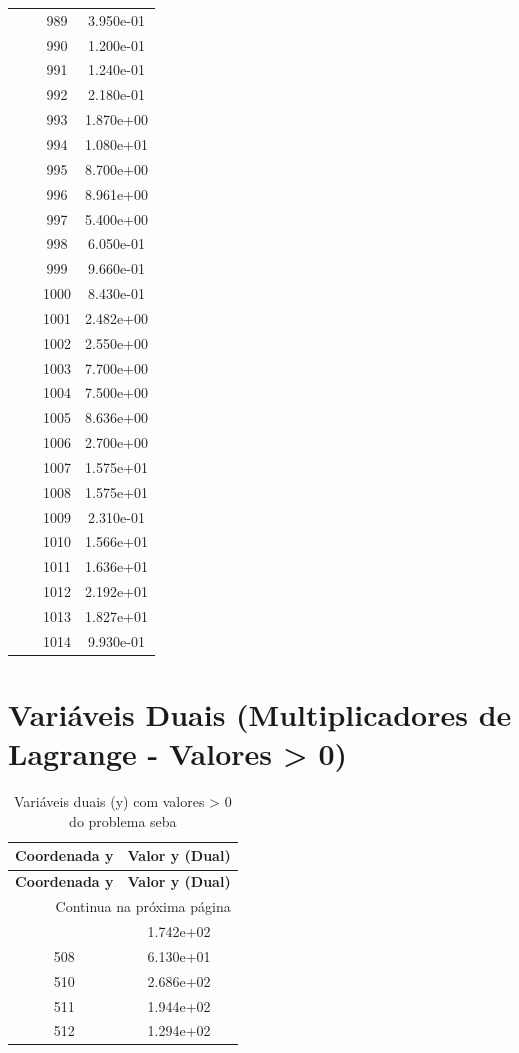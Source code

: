 \documentclass[12pt]{article}
\begin{document}
\begin{longtable}{@{}cccc@{}}
 &  & 989 & 3.950e-01 \\
 &  & 990 & 1.200e-01 \\
 &  & 991 & 1.240e-01 \\
 &  & 992 & 2.180e-01 \\
 &  & 993 & 1.870e+00 \\
 &  & 994 & 1.080e+01 \\
 &  & 995 & 8.700e+00 \\
 &  & 996 & 8.961e+00 \\
 &  & 997 & 5.400e+00 \\
 &  & 998 & 6.050e-01 \\
 &  & 999 & 9.660e-01 \\
 &  & 1000 & 8.430e-01 \\
 &  & 1001 & 2.482e+00 \\
 &  & 1002 & 2.550e+00 \\
 &  & 1003 & 7.700e+00 \\
 &  & 1004 & 7.500e+00 \\
 &  & 1005 & 8.636e+00 \\
 &  & 1006 & 2.700e+00 \\
 &  & 1007 & 1.575e+01 \\
 &  & 1008 & 1.575e+01 \\
 &  & 1009 & 2.310e-01 \\
 &  & 1010 & 1.566e+01 \\
 &  & 1011 & 1.636e+01 \\
 &  & 1012 & 2.192e+01 \\
 &  & 1013 & 1.827e+01 \\
 &  & 1014 & 9.930e-01 \\

\bottomrule
\end{longtable}


\section{Variáveis Duais (Multiplicadores de Lagrange - Valores > 0)}

\begin{longtable}{@{}cc@{}}
\caption{Variáveis duais (y) com valores > 0 do problema seba} \\
\toprule
\textbf{Coordenada y} & \textbf{Valor y (Dual)} \\
\midrule
\endfirsthead

\toprule
\textbf{Coordenada y} & \textbf{Valor y (Dual)} \\
\midrule
\endhead

\midrule \multicolumn{2}{r}{{Continua na próxima página}} \\ \midrule
\endfoot

\bottomrule
\endlastfoot
507 & 1.742e+02 \\
508 & 6.130e+01 \\
510 & 2.686e+02 \\
511 & 1.944e+02 \\
512 & 1.294e+02 \\

\bottomrule
\end{longtable}
\end{document}
